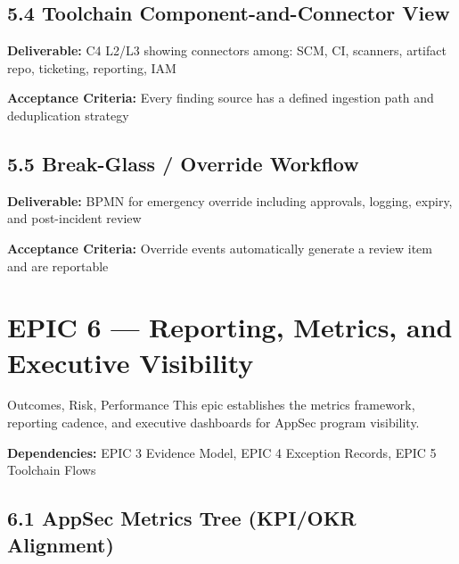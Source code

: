 \documentclass[11pt,letterpaper]{article}
\newcommand{\storyfield}[2]{\textbf{#1:} #2}
\begin{document}
\subsection{5.4 Toolchain Component-and-Connector View}

\begin{storycard}
\storyfield{Deliverable}{C4 L2/L3 showing connectors among: SCM, CI, scanners, artifact repo, ticketing, reporting, IAM}

\storyfield{Acceptance Criteria}{Every finding source has a defined ingestion path and deduplication strategy}
\end{storycard}

\subsection{5.5 Break-Glass / Override Workflow}

\begin{storycard}
\storyfield{Deliverable}{BPMN for emergency override including approvals, logging, expiry, and post-incident review}

\storyfield{Acceptance Criteria}{Override events automatically generate a review item and are reportable}
\end{storycard}

\newpage

\section{EPIC 6 --- Reporting, Metrics, and Executive Visibility}

\begin{epicbox}{Outcomes, Risk, Performance}
This epic establishes the metrics framework, reporting cadence, and executive dashboards for AppSec program visibility.

\textbf{Dependencies:} EPIC 3 Evidence Model, EPIC 4 Exception Records, EPIC 5 Toolchain Flows
\end{epicbox}

\subsection{6.1 AppSec Metrics Tree (KPI/OKR Alignment)}
\end{document}
